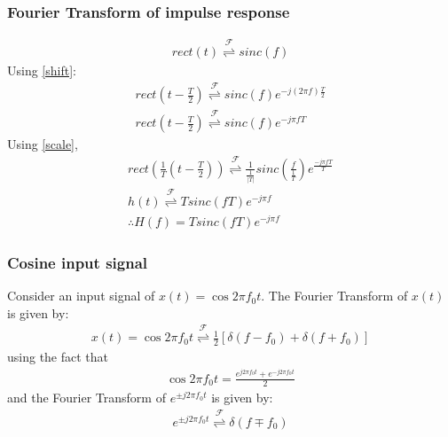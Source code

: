 \documentclass{beamer}
\providecommand{\sbrak}[1]{\ensuremath{{}\left[#1\right]}}
\providecommand{\brak}[1]{\ensuremath{\left(#1\right)}}
\providecommand{\fourier}{\overset{\mathcal{F}}{ \rightleftharpoons}}
\providecommand{\abs}[1]{\left\vert#1\right\vert}
\begin{document}
\begin{frame}
    \frametitle{Fourier Transform of impulse response}
    \begin{flushleft}
    \begin{align}
    rect(t) \fourier sinc( f)
\end{align}
Using \eqref{shift}:
\begin{align}
    rect\brak{t - \frac{T}{2}} \fourier sinc( f)e^{-j(2 \pi f)\frac{T}{2}}\\
    rect\brak{t - \frac{T}{2}} \fourier sinc( f)e^{-j \pi f T}
\end{align}
Using \eqref{scale},
\begin{align}
    rect\brak{\frac{1}{T}\brak{t - \frac{T}{2}}} \fourier \frac{1}{\frac{1}{\abs{T}}}sinc\brak{\frac{ f }{\frac{1}{T}}}e^{\frac{-j \pi f T}{T}}\\
    h(t) \fourier Tsinc\brak{ f T}e^{-j\pi f}\\
    \therefore H(f)  = Tsinc\brak{ f T}e^{-j\pi f}
\end{align}
    \end{flushleft}
\end{frame}

\begin{frame}
\frametitle{Cosine input signal}    
\begin{flushleft}
Consider an input signal of $x(t) = \cos{2\pi f_0t}$. The Fourier Transform of $x(t)$ is given by:
\begin{align}
    x(t) = \cos{2\pi f_0t} \fourier \frac{1}{2}\sbrak{\delta(f - f_0) + \delta(f + f_0)}
\end{align}
using the fact that 
\begin{align}
    \cos{2\pi f_0 t} = \frac{e^{j2\pi f_0 t} + e^{-j2\pi f_0 t}}{2}
\end{align} and the Fourier Transform of $e^{\pm j2\pi f_0 t}$ is given by:
\begin{align}
    e^{\pm j2\pi  f_0 t} \fourier \delta(f \mp f_0)
    \label{FT}
\end{align}
\end{flushleft}
\end{frame}
\end{document}
